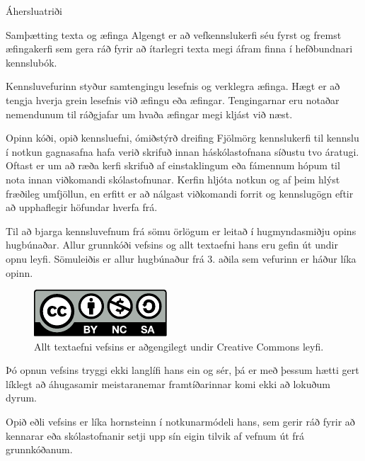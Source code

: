 \documentclass[final]{beamer}
\begin{document}
\begin{frame}
\begin{tcolorbox}[standard jigsaw, height=97cm, colframe=orange, opacityback=0, sharp corners=all]
\begin{columns}[t]
\begin{column}{.47\linewidth}
\begin{block}{Áhersluatriði}
    \begin{subblock}{Samþætting texta og æfinga}
        Algengt er að vefkennslukerfi séu fyrst og fremst æfingakerfi sem gera ráð fyrir að ítarlegri texta megi áfram finna í hefðbundnari kennslubók.

        Kennsluvefurinn styður samtengingu lesefnis og verklegra æfinga. Hægt er að tengja hverja grein lesefnis við æfingu eða æfingar. Tengingarnar eru notaðar nemendunum til ráðgjafar um hvaða æfingar megi kljást við næst.
    \end{subblock}

    \begin{subblock}{Opinn kóði, opið kennsluefni, ómiðstýrð dreifing}
        Fjölmörg kennslukerfi til kennslu í notkun gagnasafna hafa verið skrifuð innan háskólastofnana síðustu tvo áratugi. Oftast er um að ræða kerfi skrifuð af einstaklingum eða fámennum hópum til nota innan viðkomandi skólastofnunar. Kerfin hljóta notkun og af þeim hlýst fræðileg umfjöllun, en erfitt er að nálgast viðkomandi forrit og kennslugögn eftir að upphaflegir höfundar hverfa frá.
        
        Til að bjarga kennsluvefnum frá sömu örlögum er leitað í hugmyndasmiðju opins hugbúnaðar. Allur grunnkóði vefsins og allt textaefni hans eru gefin út undir opnu leyfi. Sömuleiðis er allur hugbúnaður frá 3. aðila sem vefurinn er háður líka opinn.
        \begin{figure}
            \caption{Allt textaefni vefsins er aðgengilegt undir Creative Commons leyfi.}
            \includegraphics[width=0.3\linewidth]{cc-by-nc-sa}
        \end{figure}

        Þó opnun vefsins tryggi ekki langlífi hans ein og sér, þá er með þessum hætti gert líklegt að áhugasamir meistaranemar framtíðarinnar komi ekki að lokuðum dyrum.

        Opið eðli vefsins er líka hornsteinn í notkunarmódeli hans, sem gerir ráð fyrir að kennarar eða skólastofnanir setji upp sín eigin tilvik af vefnum út frá grunnkóðanum.
    \end{subblock}

\end{block}

\end{column}


\end{columns}
\end{tcolorbox}
\end{frame}
\end{document}
